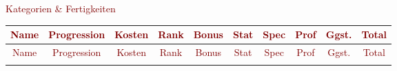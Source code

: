 \begin{center}
\textcolor{Maroon}{\Large Kategorien \& Fertigkeiten}


\begin{longtable}{llrrrrrrrr}

\multicolumn{1}{c}{\textcolor{Maroon}{Name}} & \multicolumn{1}{c}{\textcolor{Maroon}{Progression}} & \multicolumn{1}{c}{\textcolor{Maroon}{Kosten}} & \multicolumn{1}{c}{\textcolor{Maroon}{Rank}} & \multicolumn{1}{c}{\textcolor{Maroon}{Bonus}} & \multicolumn{1}{c}{\textcolor{Maroon}{Stat}} & \multicolumn{1}{c}{\textcolor{Maroon}{Spec}} & \multicolumn{1}{c}{\textcolor{Maroon}{Prof}} & \multicolumn{1}{c}{\textcolor{Maroon}{Ggst.}} & \multicolumn{1}{c}{\textcolor{Maroon}{Total}} \\ \hline
\endfirsthead

\multicolumn{1}{c}{\textcolor{Maroon}{Name}} & \multicolumn{1}{c}{\textcolor{Maroon}{Progression}} & \multicolumn{1}{c}{\textcolor{Maroon}{Kosten}} & \multicolumn{1}{c}{\textcolor{Maroon}{Rank}} & \multicolumn{1}{c}{\textcolor{Maroon}{Bonus}} &  \multicolumn{1}{c}{\textcolor{Maroon}{Stat}} & \multicolumn{1}{c}{\textcolor{Maroon}{Spec}} &  \multicolumn{1}{c}{\textcolor{Maroon}{Prof}} &\multicolumn{1}{c}{\textcolor{Maroon}{Ggst.}} & \multicolumn{1}{c}{\textcolor{Maroon}{Total}} \\
\hline
\endhead

\endfoot


\end{longtable}
\end{center}
